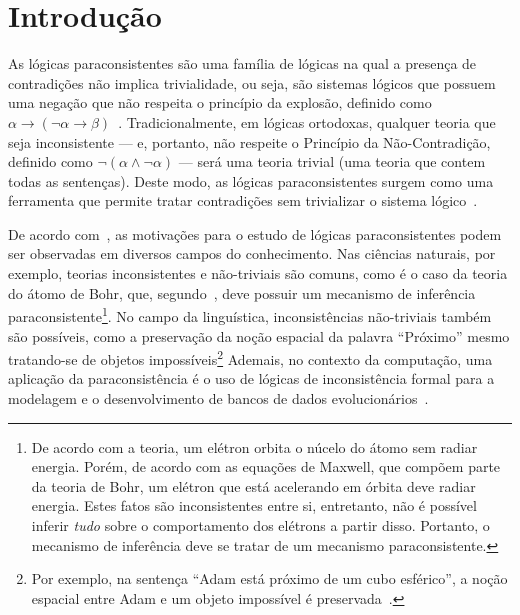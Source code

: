 \chapter{Introdução}\label{cap:Introducao}


As lógicas paraconsistentes são uma família de lógicas na qual a presença de contradições não implica trivialidade, ou seja, são sistemas lógicos que possuem uma negação que não respeita o princípio da explosão, definido como $\alpha \to (\neg \alpha \to \beta)$~\cite{carnielli2007}. Tradicionalmente, em lógicas ortodoxas, qualquer teoria que seja inconsistente {---} e, portanto, não respeite o Princípio da Não-Contradição, definido como $\neg (\alpha \land \neg \alpha)$ {---} será uma teoria trivial (uma teoria que contem todas as sentenças). Deste modo, as lógicas paraconsistentes surgem como uma ferramenta que permite tratar contradições sem trivializar o sistema lógico~\cite{Carnielli_Coniglio_2016}.

De acordo com~, as motivações para o estudo de lógicas paraconsistentes podem ser observadas em diversos campos do conhecimento. Nas ciências naturais, por exemplo, teorias inconsistentes e não-triviais são comuns, como é o caso da teoria do átomo de Bohr, que, segundo~, deve possuir um mecanismo de inferência paraconsistente\footnote{De acordo com a teoria, um elétron orbita o núcelo do átomo sem radiar energia. Porém, de acordo com as equações de Maxwell, que compõem parte da teoria de Bohr, um elétron que está acelerando em órbita deve radiar energia. Estes fatos são inconsistentes entre si, entretanto, não é possível inferir \textit{tudo} sobre o comportamento dos elétrons a partir disso. Portanto, o mecanismo de inferência deve se tratar de um mecanismo paraconsistente.}. No campo da linguística, inconsistências não-triviais também são possíveis, como a preservação da noção espacial da palavra ``Próximo'' mesmo tratando-se de objetos impossíveis\footnote{Por exemplo, na sentença ``Adam está próximo de um cubo esférico'', a noção espacial entre Adam e um objeto impossível é preservada~\cite{McGinnis2013-MCGTUA}.} Ademais, no contexto da computação, uma aplicação da paraconsistência é o uso de lógicas de inconsistência formal para a modelagem e o desenvolvimento de bancos de dados evolucionários~\cite{carnielli2000formal}.

